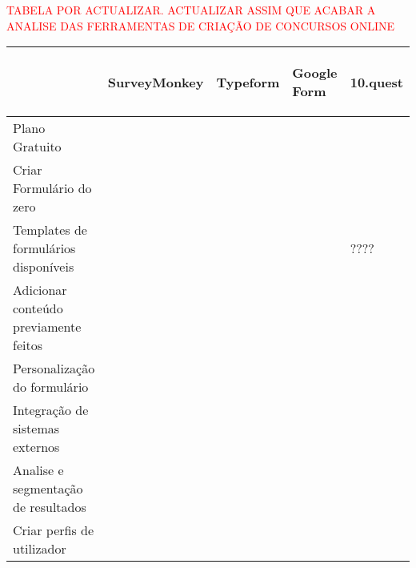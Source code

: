 \textcolor{red}{TABELA POR ACTUALIZAR. ACTUALIZAR ASSIM QUE ACABAR A ANALISE DAS FERRAMENTAS DE CRIAÇÃO DE CONCURSOS ONLINE}
	\renewcommand{\arraystretch}{2}
\setlength\arrayrulewidth{1pt}
\begin{table}[!ht]  
	\begin{center}
	\begin{tabular}{|p{4cm}|p{0.1cm}|p{0.1cm}|p{0.1cm}|p{0.1cm}|}
		\cline{2-5}
		\multicolumn{1}{c|}{} & \hspace{0.2cm}\begin{sideways}SurveyMonkey\end{sideways} & \hspace{0.4cm}\begin{sideways}Typeform\end{sideways} & \hspace{0.2cm}\begin{sideways}Google Form\end{sideways} &\hspace{0.2cm}\begin{sideways} 10.quest\end{sideways}\\ \hline
		  
		
			Plano Gratuito & \cellcolor{yellow!80}   & \cellcolor{yellow!80}  & \cellcolor{green!80} & \cellcolor{yellow!80}  \\ \hline
		
		Criar Formulário do zero & \cellcolor{green!80}  & \cellcolor{green!80}  & \cellcolor{green!80} & \cellcolor{green!80} \\ \hline
		
		Templates de formulários disponíveis& \cellcolor{green!80}  & \cellcolor{green!80} & \cellcolor{green!80} & ???? \\ \hline
		
		Adicionar conteúdo previamente feitos & \cellcolor{green!80}   & \cellcolor{red!80}  & \cellcolor{green!80} & \cellcolor{green!80}  \\ \hline
		
		Personalização do formulário &  &  &  &  \\ \hline
		
		Integração de sistemas externos &  &  &  &  \\ \hline
		
		Analise e segmentação de resultados &  &  &  &  \\ \hline
		
		Criar perfis de utilizador &  &  &  &  \\ \hline
		

\end{tabular}
\end{center}
\end{table}
